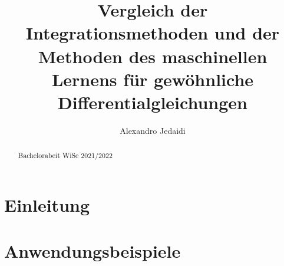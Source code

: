 \documentclass[
    paper=a4, %
    fontsize=12pt,  %
    oneside,        %
    headsepline,    %
    notitlepage     %
]{extarticle}         %
\author{Alexandro Jedaidi}
\title{\textbf{Vergleich der Integrationsmethoden und der Methoden des maschinellen Lernens für gewöhnliche Differentialgleichungen}}
\date{}
\numberwithin{equation}{section}
\begin{document}
    \maketitle
    \tableofcontents
    \newpage
    \begin{abstract}
        Bachelorabeit WiSe 2021/2022
    \end{abstract}
    \pagestyle{headings}

    \section{Einleitung}

    

    

    

    \section{Anwendungsbeispiele}

    \newpage
    \printbibliography[heading=bibintoc]
    \newpage
    \listoffigures
\end{document}
